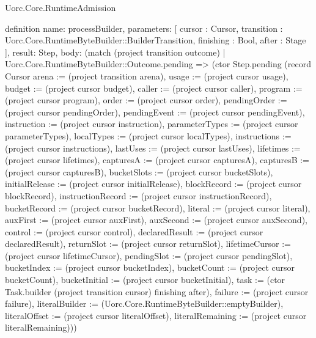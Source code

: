 \begin{lexlean}{Uorc.Core.RuntimeAdmission}
\begin{semanticmodule}
definition{
  name: processBuilder,
  parameters: [
    cursor : Cursor,
    transition : Uorc.Core.RuntimeByteBuilder::BuilderTransition,
    finishing : Bool,
    after : Stage
  ],
  result: Step,
  body: (match (project transition outcome)
    | Uorc.Core.RuntimeByteBuilder::Outcome.pending => (ctor Step.pending (record Cursor {arena := (project transition arena), usage := (project cursor usage), budget := (project cursor budget), caller := (project cursor caller), program := (project cursor program), order := (project cursor order), pendingOrder := (project cursor pendingOrder), pendingEvent := (project cursor pendingEvent), instruction := (project cursor instruction), parameterTypes := (project cursor parameterTypes), localTypes := (project cursor localTypes), instructions := (project cursor instructions), lastUses := (project cursor lastUses), lifetimes := (project cursor lifetimes), capturesA := (project cursor capturesA), capturesB := (project cursor capturesB), bucketSlots := (project cursor bucketSlots), initialRelease := (project cursor initialRelease), blockRecord := (project cursor blockRecord), instructionRecord := (project cursor instructionRecord), bucketRecord := (project cursor bucketRecord), literal := (project cursor literal), auxFirst := (project cursor auxFirst), auxSecond := (project cursor auxSecond), control := (project cursor control), declaredResult := (project cursor declaredResult), returnSlot := (project cursor returnSlot), lifetimeCursor := (project cursor lifetimeCursor), pendingSlot := (project cursor pendingSlot), bucketIndex := (project cursor bucketIndex), bucketCount := (project cursor bucketCount), bucketInitial := (project cursor bucketInitial), task := (ctor Task.builder (project transition cursor) finishing after), failure := (project cursor failure), literalBuilder := (Uorc.Core.RuntimeByteBuilder::emptyBuilder), literalOffset := (project cursor literalOffset), literalRemaining := (project cursor literalRemaining)}))
}
\end{semanticmodule}
\end{lexlean}
